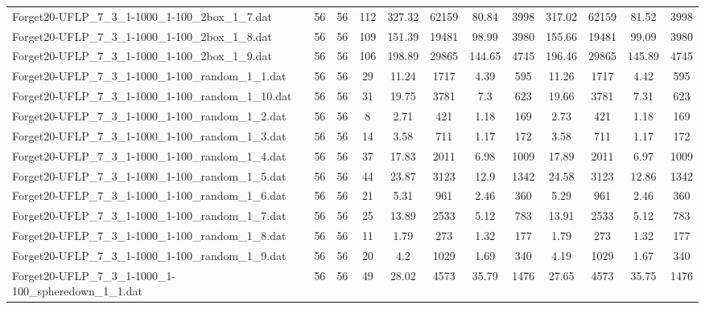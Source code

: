 \begin{sidewaystable}[!ht]
{\begin{tabular}{lccccccccccc}
Forget20-UFLP\_7\_3\_1-1000\_1-100\_2box\_1\_7.dat & 56 & 56 & 112 & 327.32 & 62159 &  \textcolor{blue2}{80.84} & 3998 & 317.02 & 62159 & 81.52 & 3998 \\
Forget20-UFLP\_7\_3\_1-1000\_1-100\_2box\_1\_8.dat & 56 & 56 & 109 & 151.39 & 19481 & 98.99 & 3980 & 155.66 & 19481 & 99.09 & 3980 \\
Forget20-UFLP\_7\_3\_1-1000\_1-100\_2box\_1\_9.dat & 56 & 56 & 106 & 198.89 & 29865 &  \textcolor{blue2}{144.65} & 4745 & 196.46 & 29865 & 145.89 & 4745 \\
Forget20-UFLP\_7\_3\_1-1000\_1-100\_random\_1\_1.dat & 56 & 56 & 29 & 11.24 & 1717 &  \textcolor{blue2}{4.39} & 595 & 11.26 & 1717 & 4.42 & 595 \\
Forget20-UFLP\_7\_3\_1-1000\_1-100\_random\_1\_10.dat & 56 & 56 & 31 & 19.75 & 3781 &  \textcolor{blue2}{7.3} & 623 & 19.66 & 3781 & 7.31 & 623 \\
Forget20-UFLP\_7\_3\_1-1000\_1-100\_random\_1\_2.dat & 56 & 56 & 8 & 2.71 & 421 &  \textcolor{blue2}{1.18} & 169 & 2.73 & 421 &  \textcolor{blue2}{1.18} & 169 \\
Forget20-UFLP\_7\_3\_1-1000\_1-100\_random\_1\_3.dat & 56 & 56 & 14 & 3.58 & 711 &  \textcolor{blue2}{1.17} & 172 & 3.58 & 711 &  \textcolor{blue2}{1.17} & 172 \\
Forget20-UFLP\_7\_3\_1-1000\_1-100\_random\_1\_4.dat & 56 & 56 & 37 & 17.83 & 2011 & 6.98 & 1009 & 17.89 & 2011 &  \textcolor{blue2}{6.97} & 1009 \\
Forget20-UFLP\_7\_3\_1-1000\_1-100\_random\_1\_5.dat & 56 & 56 & 44 & 23.87 & 3123 & 12.9 & 1342 & 24.58 & 3123 &  \textcolor{blue2}{12.86} & 1342 \\
Forget20-UFLP\_7\_3\_1-1000\_1-100\_random\_1\_6.dat & 56 & 56 & 21 & 5.31 & 961 &  \textcolor{blue2}{2.46} & 360 & 5.29 & 961 &  \textcolor{blue2}{2.46} & 360 \\
Forget20-UFLP\_7\_3\_1-1000\_1-100\_random\_1\_7.dat & 56 & 56 & 25 & 13.89 & 2533 & 5.12 & 783 & 13.91 & 2533 & 5.12 & 783 \\
Forget20-UFLP\_7\_3\_1-1000\_1-100\_random\_1\_8.dat & 56 & 56 & 11 & 1.79 & 273 & 1.32 & 177 & 1.79 & 273 & 1.32 & 177 \\
Forget20-UFLP\_7\_3\_1-1000\_1-100\_random\_1\_9.dat & 56 & 56 & 20 & 4.2 & 1029 & 1.69 & 340 & 4.19 & 1029 &  \textcolor{blue2}{1.67} & 340 \\
Forget20-UFLP\_7\_3\_1-1000\_1-100\_spheredown\_1\_1.dat & 56 & 56 & 49 & 28.02 & 4573 & 35.79 & 1476 & 27.65 & 4573 & 35.75 & 1476 \\

\end{tabular}}
\end{sidewaystable}
